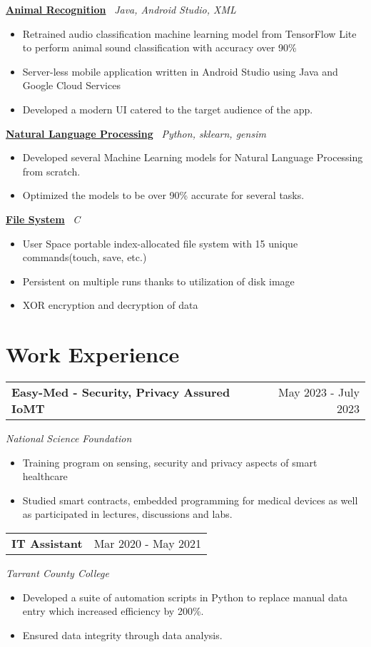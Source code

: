 \documentclass[a4paper,12pt]{article}
\begin{document}
\href{https://github.com/kilibarda4/animal-recognition-android}{\textbf{Animal Recognition}} \ \textit{Java, Android Studio, XML}
\begin{itemize}[leftmargin=*, nosep]
    \item Retrained audio classification machine learning model from TensorFlow Lite to perform animal sound classification with accuracy over 90\%
    \item Server-less mobile application written in Android Studio using Java and Google Cloud Services
    \item Developed a modern UI catered to the target audience of the app.
\end{itemize}
\href{https://github.com/kilibarda4/natural-language-processing}{\textbf{Natural Language Processing}} \ \textit{Python, sklearn, gensim}
\begin{itemize}[leftmargin=*, nosep]
    \item Developed several Machine Learning models for Natural Language Processing from scratch.
    \item Optimized the models to be over 90\% accurate for several tasks.
\end{itemize}
\href{https://github.com/kilibarda4/file-system}{\textbf{File System}} \ \textit{C}
\begin{itemize}[leftmargin=*, nosep]
    \item User Space portable index-allocated file system with 15 unique commands(touch, save, etc.)
    \item Persistent on multiple runs thanks to utilization of disk image
    \item XOR encryption and decryption of data
\end{itemize}
\section{Work Experience}

\begin{tabularx}{\linewidth}{@{}Xr@{}}
\textbf{Easy-Med - Security, Privacy Assured IoMT} & \hfill May 2023 - July 2023
\end{tabularx}
\textit{National Science Foundation}
\begin{itemize}[leftmargin=*, nosep]
    \item Training program on sensing, security and privacy aspects of smart healthcare
    \item Studied smart contracts, embedded programming for medical devices as well as participated in lectures, discussions and labs.
\end{itemize}

\begin{tabularx}{\linewidth}{@{}Xr@{}}
\textbf{IT Assistant} & \hfill Mar 2020 - May 2021
\end{tabularx}
\textit{Tarrant County College}
\begin{itemize}[leftmargin=*, nosep]
    \item Developed a suite of automation scripts in Python to replace manual data entry which increased efficiency by 200\%.
    \item Ensured data integrity through data analysis.
\end{itemize}
\vfill
\end{document}
